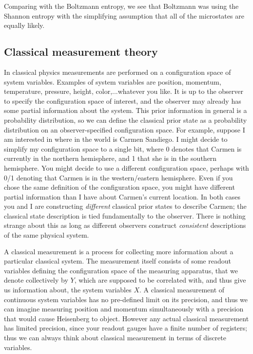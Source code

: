 \documentclass[a4paper,11pt]{article}
\begin{document}
Comparing with the Boltzmann entropy, we see that Boltzmann was using the Shannon entropy with the simplifying assumption that all of the 
microstates are equally likely. 



\subsection{Classical measurement theory}\label{ss:cmt}

In classical physics measurements are performed on a configuration space of system variables. Examples of system variables are position, momentum, temperature, pressure,
height, color,...whatever you like.
It is up to the observer to specify the configuration space of
interest, and the observer may already has some partial information about the system. This prior information in general is a probability distribution, so we can
define the classical prior state as a probability distribution on an observer-specified configuration space. For example, suppose I am interested in where in the
world is Carmen Sandiego. I might decide to simplify my configuration space to a single bit, where 0 denotes that Carmen is currently in the northern hemisphere, and
1 that she is in the southern hemisphere. You might decide to use a different configuration space, perhaps with 0/1 denoting that Carmen is in the western/eastern
hemisphere. Even if you chose the same definition of the configuration space, you might have different partial information than I have about Carmen's current location. In both
cases you and I are constructing {\it different} classical prior states to describe Carmen; the classical state description is tied fundamentally to the observer. There is nothing
strange about this as long as different observers construct {\it consistent} descriptions of the same physical system.

A classical measurement is a process for collecting more information about a particular classical system. The measurement itself consists of some readout variables
defining the configuration space of the measuring apparatus,
that we denote collectively by $Y$, which are supposed to be correlated with, and thus give us information about, the system variables $X$.
A classical measurement of continuous system variables has no pre-defined limit on its precision, and thus we can imagine measuring position
and momentum simultaneously with a precision that would cause Heisenberg to object. However any actual classical measurement has limited precision,
since your readout gauges have a finite number of registers; thus we can always think about classical measurement in terms of discrete variables.
\end{document}
